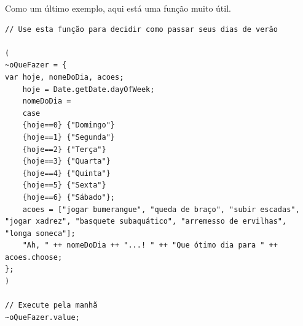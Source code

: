 Como um último exemplo, aqui está uma função muito útil.
 
\begin{lstlisting}[style=SuperCollider-IDE, basicstyle=\scttfamily\footnotesize]
// Use esta função para decidir como passar seus dias de verão

(
~oQueFazer = { 
var hoje, nomeDoDia, acoes;
	hoje = Date.getDate.dayOfWeek;
	nomeDoDia = 
	case
	{hoje==0} {"Domingo"}
	{hoje==1} {"Segunda"}
	{hoje==2} {"Terça"}
	{hoje==3} {"Quarta"}
	{hoje==4} {"Quinta"}
	{hoje==5} {"Sexta"}
	{hoje==6} {"Sábado"};
	acoes = ["jogar bumerangue", "queda de braço", "subir escadas", "jogar xadrez", "basquete subaquático", "arremesso de ervilhas", "longa soneca"];
	"Ah, " ++ nomeDoDia ++ "...! " ++ "Que ótimo dia para " ++ acoes.choose;
};
)

// Execute pela manhã
~oQueFazer.value;
\end{lstlisting}

\bigskip
{} 

